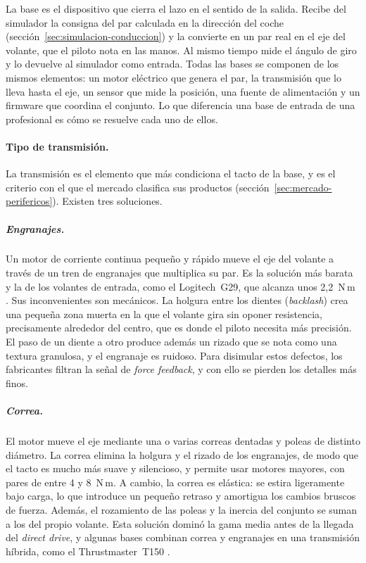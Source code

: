 La base es el dispositivo que cierra el lazo en el sentido de la salida. Recibe del simulador la consigna del par calculada en la dirección del coche (sección~\ref{sec:simulacion-conduccion}) y la convierte en un par real en el eje del volante, que el piloto nota en las manos. Al mismo tiempo mide el ángulo de giro y lo devuelve al simulador como entrada. Todas las bases se componen de los mismos elementos: un motor eléctrico que genera el par, la transmisión que lo lleva hasta el eje, un sensor que mide la posición, una fuente de alimentación y un firmware que coordina el conjunto. Lo que diferencia una base de entrada de una profesional es cómo se resuelve cada uno de ellos.

\paragraph{Tipo de transmisión.}
La transmisión es el elemento que más condiciona el tacto de la base, y es el criterio con el que el mercado clasifica sus productos (sección~\ref{sec:mercado-perifericos}). Existen tres soluciones.

\subparagraph{Engranajes.}
Un motor de corriente continua pequeño y rápido mueve el eje del volante a través de un tren de engranajes que multiplica su par. Es la solución más barata y la de los volantes de entrada, como el Logitech~G29, que alcanza unos 2,2~N\,m \parencite{logitech_g29}. Sus inconvenientes son mecánicos. La holgura entre los dientes (\textit{backlash}) crea una pequeña zona muerta en la que el volante gira sin oponer resistencia, precisamente alrededor del centro, que es donde el piloto necesita más precisión. El paso de un diente a otro produce además un rizado que se nota como una textura granulosa, y el engranaje es ruidoso. Para disimular estos defectos, los fabricantes filtran la señal de \textit{force feedback}, y con ello se pierden los detalles más finos.

\subparagraph{Correa.}
El motor mueve el eje mediante una o varias correas dentadas y poleas de distinto diámetro. La correa elimina la holgura y el rizado de los engranajes, de modo que el tacto es mucho más suave y silencioso, y permite usar motores mayores, con pares de entre 4 y 8~N\,m. A cambio, la correa es elástica: se estira ligeramente bajo carga, lo que introduce un pequeño retraso y amortigua los cambios bruscos de fuerza. Además, el rozamiento de las poleas y la inercia del conjunto se suman a los del propio volante. Esta solución dominó la gama media antes de la llegada del \textit{direct drive}, y algunas bases combinan correa y engranajes en una transmisión híbrida, como el Thrustmaster~T150 \parencite{bsimracing_2015_t150}.

